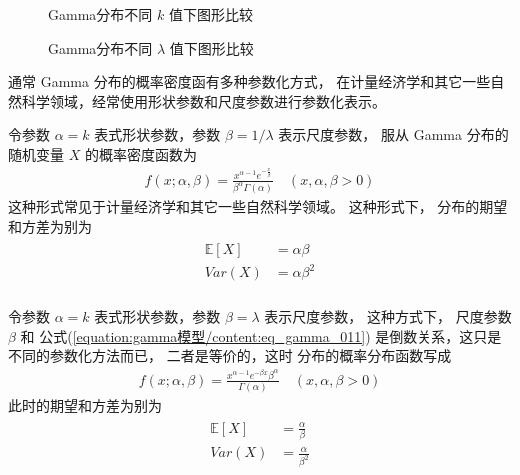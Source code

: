 \documentclass[letterpaper,10pt,english]{sphinxmanual}
\begin{document}
\begin{figure}[htbp]
\centering
\capstart

\noindent{}
\caption{Gamma分布不同 \(k\) 值下图形比较}\label{\detokenize{gamma_u6a21_u578b/content:id9}}\label{\detokenize{gamma_u6a21_u578b/content:fg-gamma-001}}\end{figure}

\begin{figure}[htbp]
\centering
\capstart

\noindent{}
\caption{Gamma分布不同 \(\lambda\) 值下图形比较}\label{\detokenize{gamma_u6a21_u578b/content:id10}}\label{\detokenize{gamma_u6a21_u578b/content:fg-gamma-002}}\end{figure}

通常 Gamma 分布的概率密度函有多种参数化方式，
在计量经济学和其它一些自然科学领域，经常使用形状参数和尺度参数进行参数化表示。


令参数 \(\alpha=k\) 表式形状参数，参数 \(\beta=1/\lambda\) 表示尺度参数，
服从 Gamma 分布的随机变量 \(X\) 的概率密度函数为
\begin{equation}\label{equation:gamma模型/content:eq_gamma_011}
\begin{split}f(x;\alpha,\beta) = \frac{ x^{\alpha-1} e^{-\frac{x}{\beta} }}{\beta^{\alpha} \Gamma(\alpha)}
\quad (x,\alpha,\beta > 0)\end{split}
\end{equation}
这种形式常见于计量经济学和其它一些自然科学领域。
这种形式下， 分布的期望和方差为别为
\begin{align}\label{equation:gamma模型/content:gamma模型/content:6}\!\begin{aligned}
\mathbb{E}[X] &= \alpha \beta\\
Var(X) &=  \alpha \beta^2\\
\end{aligned}\end{align}

令参数 \(\alpha=k\) 表式形状参数，参数 \(\beta=\lambda\) 表示尺度参数，
这种方式下， 尺度参数 \(\beta\) 和 公式(\ref{equation:gamma模型/content:eq_gamma_011}) 是倒数关系，这只是不同的参数化方法而已，
二者是等价的，这时  分布的概率分布函数写成
\begin{equation}\label{equation:gamma模型/content:eq_gamma_012}
\begin{split}f(x;\alpha,\beta) = \frac{ x^{\alpha-1} e^{-\beta x  }  \beta^{\alpha} }{ \Gamma(\alpha)}
\quad (x,\alpha,\beta > 0)\end{split}
\end{equation}
此时的期望和方差为别为
\begin{align}\label{equation:gamma模型/content:gamma模型/content:7}\!\begin{aligned}
\mathbb{E}[X] &= \frac{\alpha}{\beta}\\
Var(X) &=  \frac{\alpha} {\beta^2}\\
\end{aligned}\end{align}
\end{document}
